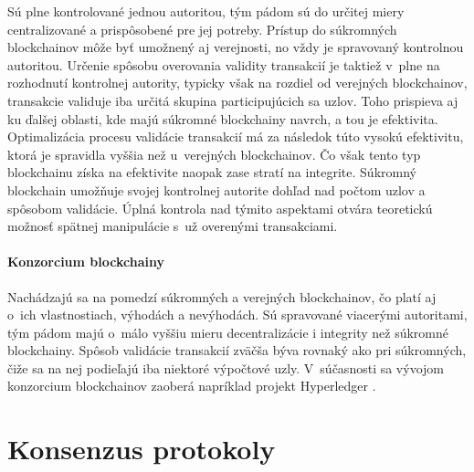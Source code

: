 Sú plne kontrolované jednou autoritou, tým pádom sú do určitej miery centralizované a prispôsobené pre jej potreby. Prístup do súkromných blockchainov môže byť umožnený aj verejnosti, no vždy je spravovaný kontrolnou autoritou. Určenie spôsobu overovania validity transakcií je taktiež v~plne na rozhodnutí kontrolnej autority, typicky však na rozdiel od verejných blockchainov, transakcie validuje iba určitá skupina participujúcich sa uzlov. Toho prispieva aj ku ďalšej oblasti, kde majú súkromné blockchainy navrch, a tou je efektivita. Optimalizácia procesu validácie transakcií má za následok túto vysokú efektivitu, ktorá je spravidla vyššia než u~verejných blockchainov. Čo však tento typ blockchainu získa na efektivite naopak zase stratí na integrite. Súkromný blockchain umožňuje svojej kontrolnej autorite dohľad nad počtom uzlov a spôsobom validácie. Úplná kontrola nad týmito aspektami otvára teoretickú možnosť spätnej manipulácie s~už overenými transakciami.

\paragraph{Konzorcium blockchainy}

Nachádzajú sa na pomedzí súkromných a verejných blockchainov, čo platí aj o~ich vlastnostiach, výhodách a nevýhodách. Sú spravované viacerými autoritami, tým pádom majú  o~málo vyššiu mieru decentralizácie i integrity než súkromné blockchainy. Spôsob validácie transakcií zväčša býva rovnaký ako pri súkromných, čiže sa na nej podieľajú iba niektoré výpočtové uzly. V~súčasnosti sa vývojom konzorcium blockchainov zaoberá napríklad projekt Hyperledger \cite{hyperledger}.

\section{Konsenzus protokoly}

